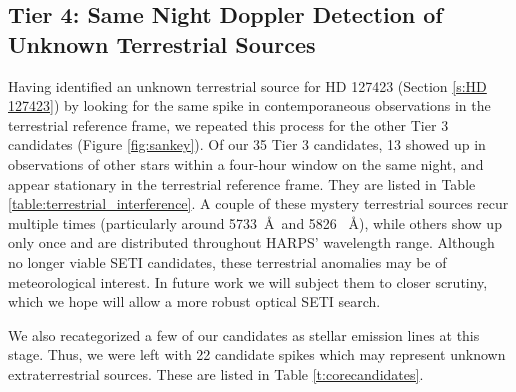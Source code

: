\documentclass[twocolumn]{aastex701}
\begin{document}
\subsection{Tier 4: Same Night Doppler Detection of Unknown Terrestrial Sources}
\label{s:doppler}
Having identified an unknown terrestrial source for HD 127423 (Section \ref{s:HD 127423}) by looking for the same spike in contemporaneous observations in the terrestrial reference frame,  we repeated this process for the other Tier 3 candidates (Figure \ref{fig:sankey}). Of our 35 Tier 3 candidates, 13 showed up in observations of other stars within a four-hour window on the same night, and appear stationary in the terrestrial reference frame. They are listed in Table \ref{table:terrestrial_interference}. A couple of these mystery terrestrial sources recur multiple times (particularly around 5733~\AA~and 5826 ~\AA), while others show up only once and are distributed throughout HARPS' wavelength range. Although no longer viable SETI candidates, these terrestrial anomalies may be of meteorological interest. In future work we will subject them to closer scrutiny, which we hope will allow a more robust optical SETI search.

We also recategorized a few of our candidates as stellar emission lines at this stage.  Thus, we were left with 22 candidate spikes which may represent unknown extraterrestrial sources.  These are listed in Table \ref{t:corecandidates}.
\end{document}
